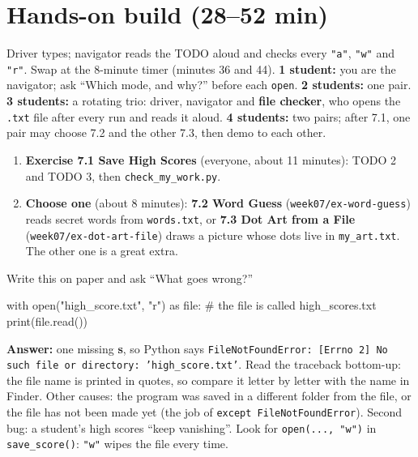 \section{Hands-on build (28--52 min)}
\begin{pairroles}
Driver types; navigator reads the TODO aloud and checks every \texttt{"a"}, \texttt{"w"} and \texttt{"r"}. Swap at the 8-minute timer (minutes 36 and 44).
\textbf{1 student:} you are the navigator; ask \enquote{Which mode, and why?} before each \texttt{open}. \textbf{2 students:} one pair.
\textbf{3 students:} a rotating trio: driver, navigator and \textbf{file checker}, who opens the \texttt{.txt} file after every run and reads it aloud.
\textbf{4 students:} two pairs; after 7.1, one pair may choose 7.2 and the other 7.3, then demo to each other.
\end{pairroles}
\begin{enumerate}[leftmargin=1.4em]
  \item \textbf{Exercise 7.1 Save High Scores} (everyone, about 11 minutes): TODO 2 and TODO 3, then \texttt{check\_my\_work.py}.
  \item \textbf{Choose one} (about 8 minutes): \textbf{7.2 Word Guess} (\texttt{week07/ex-word-guess}) reads secret words from \texttt{words.txt}, or
        \textbf{7.3 Dot Art from a File} (\texttt{week07/ex-dot-art-file}) draws a picture whose dots live in \texttt{my\_art.txt}. The other one is a great extra.
\end{enumerate}

\begin{bughunt}
Write this on paper and ask \enquote{What goes wrong?}
\begin{pycode}
with open("high_score.txt", "r") as file:   # the file is called high_scores.txt
    print(file.read())
\end{pycode}
\textbf{Answer:} one missing \textbf{s}, so Python says \texttt{FileNotFoundError: [Errno 2] No such file or directory: 'high\_score.txt'}. Read the
traceback bottom-up: the file name is printed in quotes, so compare it letter by letter with the name in Finder. Other causes: the program was saved in a
different folder from the file, or the file has not been made yet (the job of \texttt{except FileNotFoundError}).
Second bug: a student's high scores \enquote{keep vanishing}. Look for \texttt{open(..., "w")} in \texttt{save\_score()}: \texttt{"w"} wipes the file every time.
\end{bughunt}

